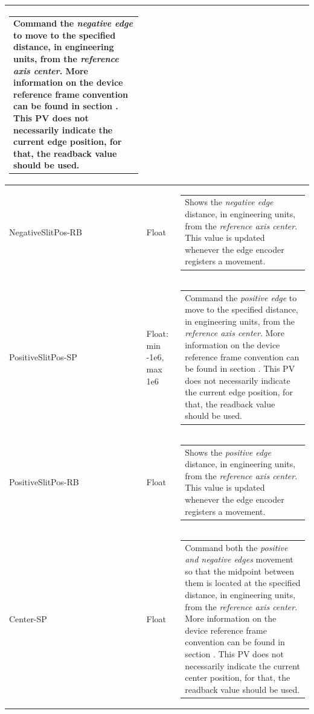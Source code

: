\documentclass[openany]{article}
\begin{document}
\begin{longtable}{| m{4.5cm} m{2.5cm}  m{7.0cm} |}
\begin{tabular}{@{}m{6cm}@{}}
                Command the \emph{negative edge} to move to the specified distance, in engineering units, from the \emph{reference axis center}. More information on the device reference frame convention can be found in section \nameref{sec:dev-reference-frame}. This PV does not necessarily indicate the current edge position, for that, the readback value should be used.
            \end{tabular} \hypertarget{}{}\\ \hline
        NegativeSlitPos-RB & Float & \begin{tabular}{@{}m{6cm}@{}}
                Shows the \emph{negative edge} distance, in engineering units, from the \emph{reference axis center}. This value is updated whenever the edge encoder registers a movement.
            \end{tabular} \hypertarget{pv:positive-edge-pos}{}\\ \hline
        PositiveSlitPos-SP & Float: min -1e6, max 1e6 & \begin{tabular}{@{}m{6cm}@{}}
                Command the \emph{positive edge} to move to the specified distance, in engineering units, from the \emph{reference axis center}. More information on the device reference frame convention can be found in section \nameref{sec:dev-reference-frame}. This PV does not necessarily indicate the current edge position, for that, the readback value should be used.
            \end{tabular} \hypertarget{}{}\\ \hline
        PositiveSlitPos-RB & Float & \begin{tabular}{@{}m{6cm}@{}}
                Shows the \emph{positive edge} distance, in engineering units, from the \emph{reference axis center}. This value is updated whenever the edge encoder registers a movement.
            \end{tabular} \hypertarget{pv:center}{}\\ \hline
        Center-SP & Float & \begin{tabular}{@{}m{6cm}@{}}
                Command both the \emph{positive and negative edges} movement so that the midpoint between them is located at the specified distance, in engineering units, from the \emph{reference axis center}. More information on the device reference frame convention can be found in section \nameref{sec:dev-reference-frame}. This PV does not necessarily indicate the current center position, for that, the readback value should be used.

\end{tabular}
\end{longtable}
\end{document}
